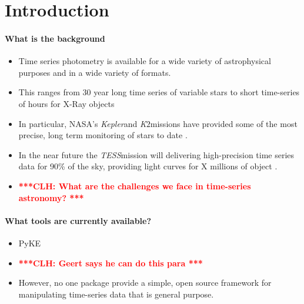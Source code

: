 \documentclass[twocolumn]{aastex62}
\newcommand{\ktwo}{{\it K$\mathit{2}$}}
\newcommand{\tess}{{\it TESS}}
\newcommand{\kepler}{{\it Kepler}}
\newcommand{\clh}[1]{\textcolor{red}{ \textbf{***CLH: #1 ***}}}
\begin{document}
\keywords{}

\section{Introduction} \label{sec:intro}

\paragraph{What is the background}
\begin{itemize}
\item{Time series photometry is available for a wide variety of astrophysical purposes and in a wide variety of formats.}
\item{This ranges from 30 year long time series of variable stars\cite{citationneeded} to short time-series of hours for X-Ray objects \cite{citationneeded}}
\item{In particular, NASA's \kepler and \ktwo missions have provided some of the most precise, long term monitoring of stars to date \cite{citationneeded}.}
\item{In the near future the \tess mission will delivering high-precision time series data for 90\% of the sky, providing light curves for X millions of object \cite{citationneeded}.}
\item{\clh{What are the challenges we face in time-series astronomy?}}
\end{itemize}

\paragraph{What tools are currently available?}
\begin{itemize}
\item PyKE
\item \clh{Geert says he can do this para}
\item However, no one package provide a simple, open source framework for manipulating time-series data that is general purpose.
\end{itemize}
\end{document}
